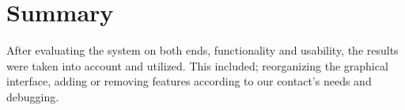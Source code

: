 \chapter{Summary}

After evaluating the system on both ends, functionality and usability, the results were taken into account and utilized.
This included; reorganizing the graphical interface, adding or removing features according to our contact's needs and debugging.
